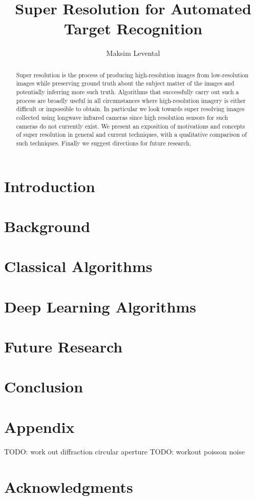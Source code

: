 \documentclass[journal]{IEEEtran}
\begin{document}
    \title{Super Resolution for Automated Target Recognition}
    \author{Maksim Levental}
    \maketitle

    \begin{abstract}
        Super resolution is the process of producing high-resolution images from low-resolution images while preserving ground truth about the subject matter of the images and potentially inferring more such truth.
        Algorithms that successfully carry out such a process are broadly useful in all circumstances where high-resolution imagery is either difficult or impossible to obtain.
        In particular we look towards super resolving images collected using longwave infrared cameras since high resolution sensors for such cameras do not currently exist.
        We present an exposition of motivations and concepts of super resolution in general and current techniques, with a qualitative comparison of such techniques.
        Finally we suggest directions for future research.
    \end{abstract}

    \section{Introduction}\label{sec:introduction}
    
%
    \section{Background}\label{sec:background}
    

    \section{Classical Algorithms}\label{sec:classical-algorithms}
    

    \section{Deep Learning Algorithms}\label{sec:deep-learning-algorithms}
    \section{Future Research}\label{sec:future-research}
    \section{Conclusion}\label{sec:conclusion}
    \section{Appendix}\label{sec:appendix}
    TODO: work out diffraction circular aperture
    TODO: workout poisson noise
    \section*{Acknowledgments}
    \newpage
    \printbibliography
\end{document}
